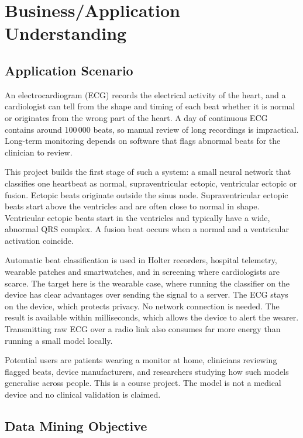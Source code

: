 \section{Business/Application Understanding}

\subsection{Application Scenario}

An electrocardiogram (ECG) records the electrical activity of the heart, and a cardiologist can tell from the shape and timing of each beat whether it is normal or originates from the wrong part of the heart. A day of continuous ECG contains around 100\,000 beats, so manual review of long recordings is impractical. Long-term monitoring depends on software that flags abnormal beats for the clinician to review.

This project builds the first stage of such a system: a small neural network that classifies one heartbeat as normal, supraventricular ectopic, ventricular ectopic or fusion. Ectopic beats originate outside the sinus node. Supraventricular ectopic beats start above the ventricles and are often close to normal in shape. Ventricular ectopic beats start in the ventricles and typically have a wide, abnormal QRS complex. A fusion beat occurs when a normal and a ventricular activation coincide.

Automatic beat classification is used in Holter recorders, hospital telemetry, wearable patches and smartwatches, and in screening where cardiologists are scarce. The target here is the wearable case, where running the classifier on the device has clear advantages over sending the signal to a server. The ECG stays on the device, which protects privacy. No network connection is needed. The result is available within milliseconds, which allows the device to alert the wearer. Transmitting raw ECG over a radio link also consumes far more energy than running a small model locally.

Potential users are patients wearing a monitor at home, clinicians reviewing flagged beats, device manufacturers, and researchers studying how such models generalise across people. This is a course project. The model is not a medical device and no clinical validation is claimed.

\subsection{Data Mining Objective}


